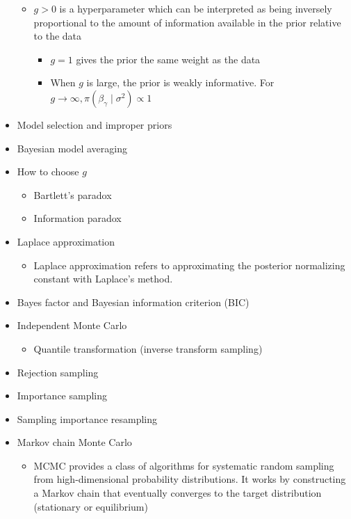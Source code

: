 \documentclass[a4paper]{article}
\begin{document}
\begin{itemize}
\begin{itemize}
        \item $g>0$ is a hyperparameter which can be interpreted as being inversely proportional to the amount of information available in the prior relative to the data
        \begin{itemize}
            \item $g=1$ gives the prior the same weight as the data
            \item When $g$ is large, the prior is weakly informative. For $g\to\infty, \pi(\beta_{\gamma}\mid\sigma^2)\propto 1$
        \end{itemize}
    \end{itemize}
    \item Model selection and improper priors
    \item Bayesian model averaging
    \item How to choose $g$
    \begin{itemize}
        \item Bartlett's paradox
        \item Information paradox
    \end{itemize}
    \item Laplace approximation
    \begin{itemize}
        \item Laplace approximation refers to approximating the posterior normalizing constant with Laplace's method.
    \end{itemize}
    \item Bayes factor and Bayesian information criterion (BIC)
    \item Independent Monte Carlo
    \begin{itemize}
        \item Quantile transformation (inverse transform sampling)
    \end{itemize}
    \item Rejection sampling
    \item Importance sampling
    \item Sampling importance resampling
    \item Markov chain Monte Carlo
    \begin{itemize}
        \item MCMC provides a class of algorithms for systematic random sampling from high-dimensional probability distributions. It works by constructing a Markov chain that eventually converges to the target distribution (stationary or equilibrium)
        \begin{itemize}

\end{itemize}
\end{itemize}
\end{itemize}
\end{document}
